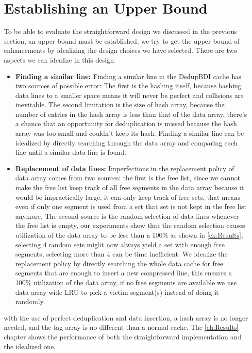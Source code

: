 \section{Establishing an Upper Bound}
\label{sec:Upper Bound}
To be able to evaluate the straightforward design we discussed in the previous section, an upper bound must be established, we try to get the upper bound of enhancements by idealizing the design choices we have selected. There are two aspects we can idealize in this design:
\begin{itemize}
    \item \textbf{Finding a similar line:} Finding a similar line in the DedupBDI cache has two sources of possible error: The first is the hashing itself, because hashing data lines to a smaller space means it will never be perfect and collisions are inevitable. The second limitation is the size of hash array, because the number of entries in the hash array is less than that of the data array, there's a chance that an opportunity for deduplication is missed because the hash array was too small and couldn't keep its hash. Finding a similar line can be idealized by directly searching through the data array and comparing each line until a similar data line is found.
    \item \textbf{Replacement of data lines:} Imperfections in the replacement policy of data array comes from two sources: the first is the free list, since we cannot make the free list keep track of all free segments in the data array because it would be impractically large, it can only keep track of free sets, that means even if only one segment is used from a set that set is not kept in the free list anymore. The second source is the random selection of data lines whenever the free list is empty, our experiments show that the random selection causes utilization of the data array to be less than a 100\% as shown in \ref{ch:Results}, selecting 4 random sets might now always yield a set with enough free segments, selecting more than 4 can be time inefficient. We idealize the replacement policy by directly searching the whole data cache for free segments that are enough to insert a new compressed line, this ensures a 100\% utilization of the data array, if no free segments are available we use data array wide LRU to pick a victim segment(s) instead of doing it randomly.
\end{itemize}
with the use of perfect deduplication and data insertion, a hash array is no longer needed, and the tag array is no different than a normal cache. The \ref{ch:Results} chapter shows the performance of both the straightforward implementation and the idealized one.

